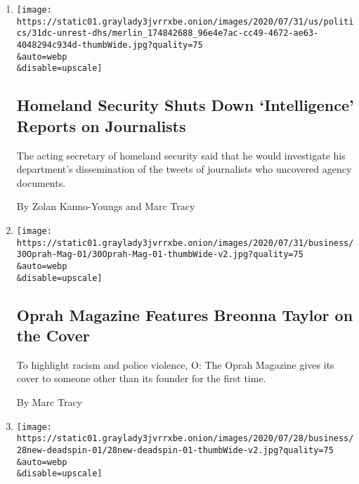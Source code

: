 \begin{enumerate}
\def\labelenumi{\arabic{enumi}.}
\item
  \href{/2020/07/31/us/politics/homeland-security-portland.html}{}

  \texttt{[image: https://static01.graylady3jvrrxbe.onion/images/2020/07/31/us/politics/31dc-unrest-dhs/merlin\_174842688\_96e4e7ac-cc49-4672-ae63-4048294c934d-thumbWide.jpg?quality=75\\\&auto=webp\\\&disable=upscale]}

  \hypertarget{homeland-security-shuts-down-intelligence-reports-on-journalists}{%
  \subsection{Homeland Security Shuts Down `Intelligence' Reports on
  Journalists}\label{homeland-security-shuts-down-intelligence-reports-on-journalists}}

  The acting secretary of homeland security said that he would
  investigate his department's dissemination of the tweets of
  journalists who uncovered agency documents.

  By Zolan Kanno-Youngs and Marc Tracy
\item
  \href{/2020/07/30/business/media/oprah-magazine-breonna-taylor-cover.html}{}

  \texttt{[image: https://static01.graylady3jvrrxbe.onion/images/2020/07/31/business/30Oprah-Mag-01/30Oprah-Mag-01-thumbWide-v2.jpg?quality=75\\\&auto=webp\\\&disable=upscale]}

  \hypertarget{oprah-magazine-features-breonna-taylor-on-the-cover}{%
  \subsection{Oprah Magazine Features Breonna Taylor on the
  Cover}\label{oprah-magazine-features-breonna-taylor-on-the-cover}}

  To highlight racism and police violence, O: The Oprah Magazine gives
  its cover to someone other than its founder for the first time.

  By Marc Tracy
\item
  \href{/2020/07/28/business/media/deadspin-staffers-start-defector.html}{}

  \texttt{[image: https://static01.graylady3jvrrxbe.onion/images/2020/07/28/business/28new-deadspin-01/28new-deadspin-01-thumbWide-v2.jpg?quality=75\\\&auto=webp\\\&disable=upscale]}

  \hypertarget{after-quitting-deadspin-in-protest-theyre-starting-a-new-site}{%
}
\end{enumerate}
